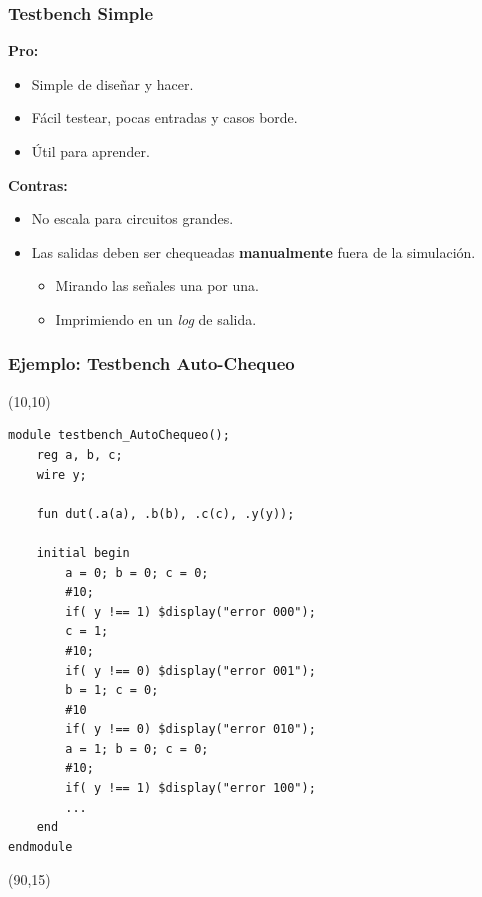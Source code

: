 \documentclass[aspectratio=169]{beamer}
\begin{document}
\begin{frame}[fragile,t]
    \frametitle{Testbench Simple}
    \textcolor{v}{\textbf{Pro:}}\\
    \begin{itemize}
    \item Simple de diseñar y hacer.
    \item Fácil testear, pocas entradas y casos borde.
    \item Útil para aprender.
    \end{itemize}
    \pause
    \textcolor{r}{\textbf{Contras:}}\\
    \begin{itemize}
    \item No escala para circuitos grandes.
    \item Las salidas deben ser chequeadas \textbf{manualmente} fuera de la simulación.
    \begin{itemize}
    \item Mirando las señales una por una.
    \item Imprimiendo en un \emph{log} de salida.
    \end{itemize}
    \end{itemize}
\end{frame}

\begin{frame}[fragile,t]
    \frametitle{Ejemplo: Testbench Auto-Chequeo}
    \begin{textblock}{75}(10,10)
\lstset{basicstyle=\scriptsize}
\begin{lstlisting}
module testbench_AutoChequeo();
    reg a, b, c;
    wire y;
    
    fun dut(.a(a), .b(b), .c(c), .y(y));

    initial begin
        a = 0; b = 0; c = 0;
        #10;
        if( y !== 1) $display("error 000");
        c = 1;
        #10;
        if( y !== 0) $display("error 001");
        b = 1; c = 0;
        #10
        if( y !== 0) $display("error 010");
        a = 1; b = 0; c = 0;
        #10;
        if( y !== 1) $display("error 100");
        ...
    end
endmodule
\end{lstlisting}
    \end{textblock}
    \begin{textblock}{55}(90,15)
    \small
    \bigskip
    \bigskip
    \end{textblock}
\end{frame}
\end{document}
